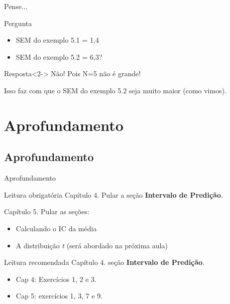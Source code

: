 \documentclass{beamer}
\begin{document}
\begin{frame}{Pense...}
  \begin{block}{Pergunta}
  \begin{itemize}
  \item SEM do exemplo 5.1 = 1,4
  \item SEM do exemplo 5.2 = 6,3?
  \end{itemize}
  \end{block}
  \begin{block}{Resposta}<2->
    Não! Pois N=5 não é grande!

    \bigskip
    Isso faz com que o SEM do exemplo 5.2 seja muito maior (como vimos).
  \end{block}
\end{frame}

\section{Aprofundamento}

\subsection{Aprofundamento}

\begin{frame}{Aprofundamento}
  \begin{block}{Leitura obrigatória}
    Capítulo 4. Pular a seção {\bf Intervalo de Predição}.

    Capítulo 5. Pular as seções:
    \begin{itemize}
    \item Calculando o IC da média
    \item A distribuição {\em t} (será abordado na próxima aula)
    \end{itemize}

  \end{block}
  \begin{block}{Leitura recomendada}
    Capítulo 4. seção {\bf Intervalo de Predição}.
  \end{block}
  \begin{itemize}
  \item Cap 4: Exercícios 1, 2 e 3.
  \item Cap 5: exercícios 1, 3, 7 e 9.
  \end{itemize}
\end{frame}
\end{document}
